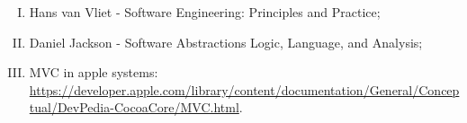 \begin{enumerate}[(I)]
  \item Hans van Vliet - Software Engineering: Principles and Practice;
  \item Daniel Jackson - Software Abstractions Logic, Language, and Analysis;
  \item MVC in apple systems: \url{https://developer.apple.com/library/content/documentation/General/Conceptual/DevPedia-CocoaCore/MVC.html}.
\end{enumerate}